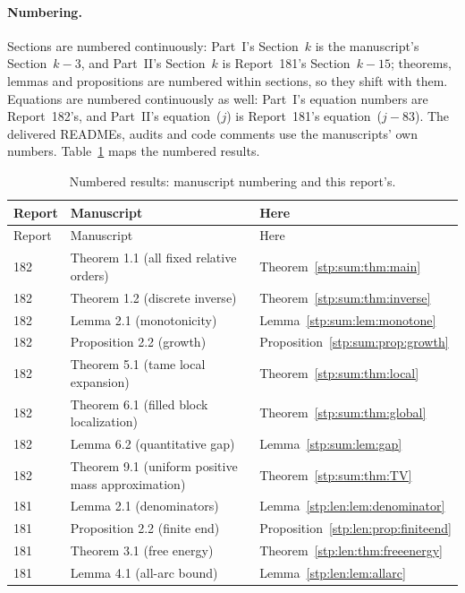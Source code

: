 \documentclass[11pt]{article}
\theoremstyle{remark}\newtheorem{remark}[theorem]{Remark}
\begin{document}
\paragraph{Numbering.} Sections are numbered continuously: Part~I's
Section~$k$ is the manuscript's Section~$k-3$, and Part~II's Section~$k$ is
Report~181's Section~$k-15$; theorems, lemmas and propositions are numbered
within sections, so they shift with them. Equations are numbered
continuously as well: Part~I's equation numbers are Report~182's, and
Part~II's equation~($j$) is Report~181's equation~($j-83$). The
delivered READMEs, audits and code comments use the manuscripts' own
numbers. Table~\ref{stp:tab:crosswalk} maps the numbered results.

\begin{center}
\small
\begin{longtable}{@{}lll@{}}
\caption{Numbered results: manuscript numbering and this report's.}\label{stp:tab:crosswalk}\\
\toprule
Report & Manuscript & Here\\
\midrule
\endfirsthead
\toprule
Report & Manuscript & Here\\
\midrule
\endhead
182 & Theorem 1.1 (all fixed relative orders) & Theorem~\ref{stp:sum:thm:main}\\
182 & Theorem 1.2 (discrete inverse) & Theorem~\ref{stp:sum:thm:inverse}\\
182 & Lemma 2.1 (monotonicity) & Lemma~\ref{stp:sum:lem:monotone}\\
182 & Proposition 2.2 (growth) & Proposition~\ref{stp:sum:prop:growth}\\
182 & Theorem 5.1 (tame local expansion) & Theorem~\ref{stp:sum:thm:local}\\
182 & Theorem 6.1 (filled block localization) & Theorem~\ref{stp:sum:thm:global}\\
182 & Lemma 6.2 (quantitative gap) & Lemma~\ref{stp:sum:lem:gap}\\
182 & Theorem 9.1 (uniform positive mass approximation) & Theorem~\ref{stp:sum:thm:TV}\\
181 & Lemma 2.1 (denominators) & Lemma~\ref{stp:len:lem:denominator}\\
181 & Proposition 2.2 (finite end) & Proposition~\ref{stp:len:prop:finiteend}\\
181 & Theorem 3.1 (free energy) & Theorem~\ref{stp:len:thm:freeenergy}\\
181 & Lemma 4.1 (all-arc bound) & Lemma~\ref{stp:len:lem:allarc}\\

\end{longtable}
\end{center}
\end{document}
